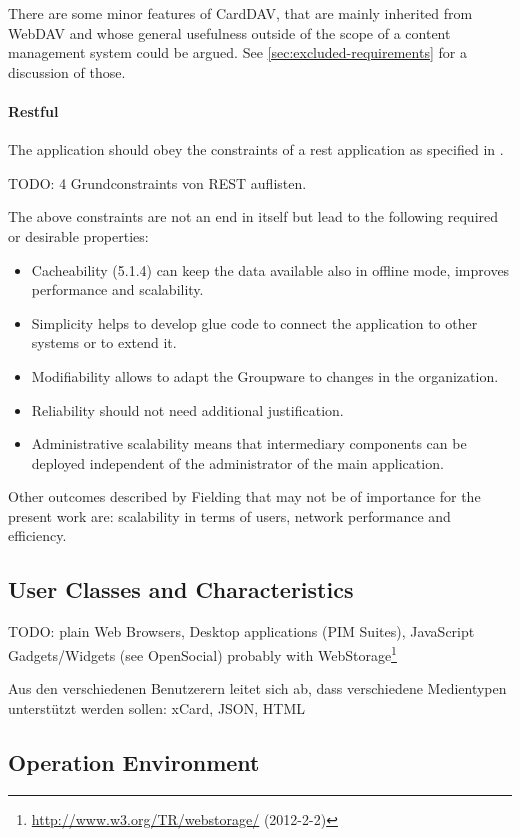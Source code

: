 \documentclass[12pt,a4paper]{scrartcl}		%
\newcommand{\citeurl}[2]{\url{#1} (#2)}
\begin{document}
There are some minor features of CardDAV, that are mainly inherited from WebDAV
and whose general usefulness outside of the scope of a content management system
could be argued. See \autoref{sec:excluded-requirements} for a discussion of
those.

\paragraph{Restful}
The application should obey the constraints of a rest application as specified
in \cite{Fielding2000}.

TODO: 4 Grundconstraints von REST auflisten.

The above constraints are not an end in itself but lead to the following
required or desirable properties:

\begin{itemize}
\item Cacheability (5.1.4) can keep the data available also in offline mode, improves performance and scalability.
\item Simplicity helps to develop glue code to connect the application to other systems or to extend it.
\item Modifiability allows to adapt the Groupware to changes in the organization.
\item Reliability should not need additional justification.
\item Administrative scalability means that intermediary components can be deployed independent of the administrator of the main application.
\end{itemize}

Other outcomes described by Fielding that may not be of importance for the
present work are: scalability in terms of users, network performance and
efficiency.



\subsection{User Classes and Characteristics}

TODO: plain Web Browsers, Desktop applications (PIM Suites), JavaScript Gadgets/Widgets (see OpenSocial) probably with WebStorage\footnote{\citeurl{http://www.w3.org/TR/webstorage/}{2012-2-2}}

Aus den verschiedenen Benutzerern leitet sich ab, dass verschiedene Medientypen unterstützt werden sollen: xCard, JSON, HTML

\subsection{Operation Environment}
\end{document}
